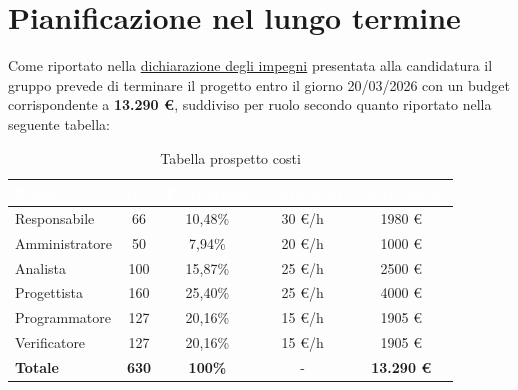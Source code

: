 \documentclass[a4paper, 11pt]{article}
\begin{document}
\section{Pianificazione nel lungo termine}
Come riportato nella \href{https://byte-holders.github.io/Documentazione/Candidatura/Dichiarazione_Impegni.pdf}{dichiarazione degli impegni} presentata alla candidatura il gruppo prevede di terminare il progetto entro il giorno 20/03/2026 con un budget corrispondente a \textbf{13.290 €}, suddiviso per ruolo secondo quanto riportato nella seguente tabella:
\begin{table}[H]
  \centering
  \begin{tabular}{|l|c|c|c|c|}
    \hline
    \cellcolor{AccentColor}\textbf{\textcolor{white}{Ruolo}} & 
    \cellcolor{AccentColor}\textbf{\textcolor{white}{Ore}} & 
    \cellcolor{AccentColor}\textbf{\textcolor{white}{Percentuale}} & 
    \cellcolor{AccentColor}\textbf{\textcolor{white}{Costo(€/h)}} & 
    \cellcolor{AccentColor}\textbf{\textcolor{white}{Costo Totale}} \\
    \hline
    
    Responsabile & 66 & 10,48\% & 30 €/h & 1980 € \\ \hline
    Amministratore & 50 & 7,94\% & 20 €/h & 1000 € \\ \hline
    Analista & 100 & 15,87\% & 25 €/h & 2500 € \\ \hline
    Progettista & 160 & 25,40\% & 25 €/h & 4000 € \\ \hline
    Programmatore & 127 & 20,16\% & 15 €/h & 1905 € \\ \hline
    Verificatore & 127 & 20,16\% & 15 €/h & 1905 € \\ \hline
    \textbf{Totale} & \textbf{630} & \textbf{100\%} & - & \textbf{13.290 €} \\ \hline
  \end{tabular}
  \caption{Tabella prospetto costi}
\end{table}
\end{document}

